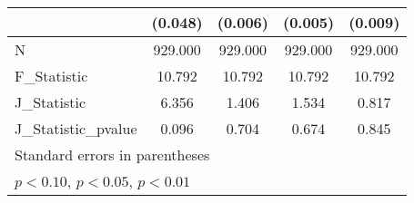 {\begin{tabular}{l*{4}{c}}
            &     (0.048)         &     (0.006)         &     (0.005)         &     (0.009)         \\
\hline
N           &     929.000         &     929.000         &     929.000         &     929.000         \\
F\_Statistic &      10.792         &      10.792         &      10.792         &      10.792         \\
J\_Statistic &       6.356         &       1.406         &       1.534         &       0.817         \\
J\_Statistic\_pvalue&       0.096         &       0.704         &       0.674         &       0.845         \\
\hline\hline
\multicolumn{5}{l}{\footnotesize Standard errors in parentheses}\\
\multicolumn{5}{l}{\footnotesize \sym{*} \(p<0.10\), \sym{**} \(p<0.05\), \sym{***} \(p<0.01\)}\\
\end{tabular}
}
